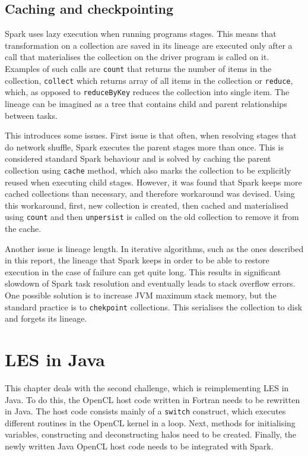 \documentclass{l4proj}
\begin{document}
\section{Caching and checkpointing}

Spark uses lazy execution when running programs stages. This means that transformation
on a collection are saved in its lineage are executed only after a call
that materialises the collection on the driver program is called on it. Examples of such calls are
\texttt{count} that returns the number of items in the collection, \texttt{collect}
which returns array of all items in the collection or \texttt{reduce}, which, as opposed
to \texttt{reduceByKey} reduces the collection into single item. The lineage can
be imagined as a tree that contains child and parent relationships between tasks.

This introduces some issues. First issue is that often, when resolving stages that
do network shuffle, Spark executes the parent stages more than once. This is
considered standard Spark behaviour and is solved by caching the parent collection
using \texttt{cache} method, which also marks the collection to be explicitly reused
when executing child stages. However, it was found that Spark keeps more cached collections
than necessary, and therefore workaround was devised. Using this workaround, first,
new collection is created, then cached and materialised using \texttt{count} and 
then \texttt{unpersist} is called on the old collection to remove it from the cache.

Another issue is lineage length. In iterative algorithms, such as the ones described 
in this report, the lineage that Spark keeps in order to be able to restore execution
in the case of failure can get quite long. This results in significant slowdown of
Spark task resolution and eventually leads to stack overflow errors. One possible
solution is to increase JVM maximum stack memory, but the standard practice is to
\texttt{chekpoint} collections. This serialises the collection to disk and forgets
its lineage.

\chapter{LES in Java}
\label{chap:les_java}

This chapter deals with the second challenge, which is reimplementing LES in Java.
To do this, the OpenCL host code written in Fortran needs to be rewritten in
Java. The host code consists mainly of a \texttt{switch} construct, which executes
different routines in the OpenCL kernel in a loop. Next, methods for initialising variables,
constructing and deconstructing halos need to be created. Finally, the newly 
written Java OpenCL host code needs to be integrated with Spark.
\end{document}
